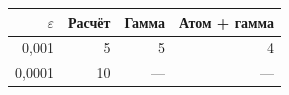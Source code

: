 \begin{tabular}{rrrr}
\hline
$\varepsilon$ & Расчёт & Гамма & Атом + гамма \\
\hline
0,001 & 5 & 5 & 4 \\
0,0001 & 10 & --- & --- \\
\hline
\end{tabular}
